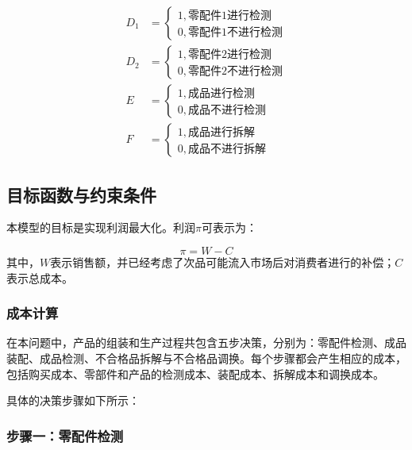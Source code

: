 \documentclass[withoutpreface,bwprint]{cumcmthesis} %
\begin{document}
\begin{equation}
	\begin{aligned}
		D_1 & =\left\{\begin{array}{l}
			1 , \text{零配件1进行检测}\\
			0 , \text{零配件1不进行检测}
		\end{array}\right. \\
		D_2 & =\left\{\begin{array}{l}
			1 , \text{零配件2进行检测}\\
			0 , \text{零配件2不进行检测}
		\end{array}\right. \\
		E & =\left\{\begin{array}{l}
			1 , \text{成品进行检测} \\
			0 , \text{成品不进行检测}
		\end{array}\right. \\
		F & =\left\{\begin{array}{l}
			1 , \text{成品进行拆解} \\
			0 , \text{成品不进行拆解}
		\end{array}\right.
	\end{aligned}
\end{equation}

\subsection{目标函数与约束条件}

本模型的目标是实现利润最大化。利润$\pi$可表示为：

\begin{equation}
	\pi=W-C
	\label{pai}
\end{equation}
其中，$W$表示销售额，并已经考虑了次品可能流入市场后对消费者进行的补偿；$C$表示总成本。

\subsubsection{成本计算}
在本问题中，产品的组装和生产过程共包含五步决策，分别为：零配件检测、成品装配、成品检测、不合格品拆解与不合格品调换。每个步骤都会产生相应的成本，包括购买成本、零部件和产品的检测成本、装配成本、拆解成本和调换成本。

具体的决策步骤如下所示：

\subsubsection*{步骤一：零配件检测}
\end{document}
